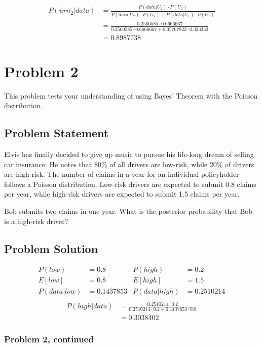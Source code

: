 \documentclass[12pt]{article}
\theoremstyle{definition}
\begin{document}
\begin{align*}
P(urn_2|data) &= \frac{P(data|U_2)\cdot P(U_2)}{P(data|U_2)\cdot P(U_2) + P(data|U_1) \cdot P(U_1)}\\
&= \frac{0.2560585 \cdot 0.6666667}{0.2560585 \cdot 0.6666667 + 0.05767822 \cdot 0.333333}\\
&= 0.8987738
\end{align*}


\newpage
\section*{Problem 2}

This problem tests your understanding of using Bayes' Theorem with the Poisson distribution.

\subsection*{Problem Statement}

Elvis has finally decided to give up music to pursue his life-long dream of selling car insurance. He notes that 80\% of all drivers are low-risk, while 20\% of drivers are high-risk. The number of claims in a year for an individual policyholder follows a Poisson distribution. Low-risk drivers are expected to submit 0.8 claims per year, while high-risk drivers are expected to submit 1.5 claims per year.

\bigskip
Bob submits two claims in one year. What is the posterior probability that Bob is a high-risk driver?


\subsection*{Problem Solution}
\begin{align*}
P(low) &= 0.8 &P(high) &= 0.2\\
E[low] &= 0.8 &E[high] &= 1.5\\
P(data|low) &= 0.1437853 & P(data|high) &= 0.2510214\\
\end{align*}
\begin{align*}
P(high|data) &= \frac{0.2510214 \cdot 0.2}{0.2510214 \cdot 0.2 + 0.1437853 \cdot 0.8}\\
&= 0.3038402
\end{align*}

\newpage
\subsubsection*{Problem 2, continued}
\end{document}
